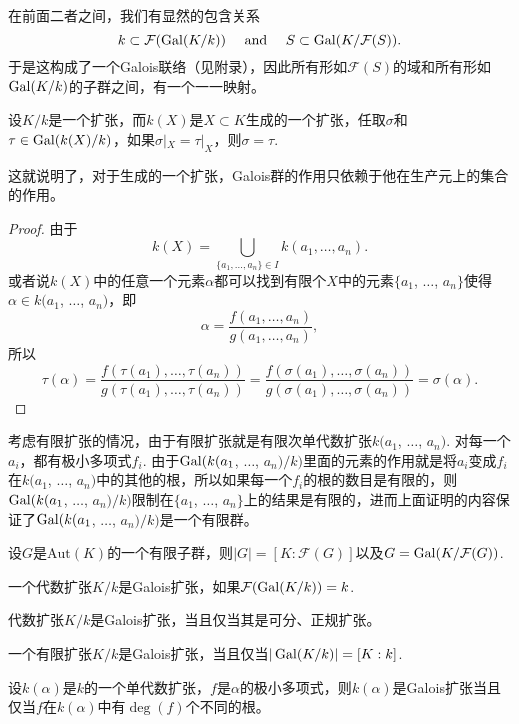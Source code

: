 在前面二者之间，我们有显然的包含关系
\[
    k\subset \mathcal{F}(\operatorname{Gal}(K/k))\quad \text{ and }\quad S\subset \operatorname{Gal}(K/\mathcal{F}(S)).
\]
于是这构成了一个Galois联络（见附录），因此所有形如$\mathcal{F}(S)$的域和所有形如$\operatorname{Gal}(K/k)$的子群之间，有一个一一映射。

\begin{lem}
    设$K/k$是一个扩张，而$k(X)$是$X\subset K$生成的一个扩张，任取$\sigma$和$\tau\in \operatorname{Gal}(k(X)/k)$，如果$\sigma|_X=\tau|_X$，则$\sigma=\tau$.
\end{lem}

这就说明了，对于生成的一个扩张，Galois群的作用只依赖于他在生产元上的集合的作用。

\begin{proof}
    由于\[
        k(X)=\bigcup_{\{a_1,\dots,a_n\}\in I} k(a_1,\dots,a_n).
    \]
    或者说$k(X)$中的任意一个元素$\alpha$都可以找到有限个$X$中的元素$\{a_1$, $\dots$, $a_n\}$使得$\alpha\in k(a_1$, $\dots$, $a_n)$，即
    \[
        \alpha=\frac{f(a_1,\dots,a_n)}{g(a_1,\dots,a_n)},
    \]
    所以
    \[
        \tau(\alpha)=\frac{f(\tau(a_1),\dots,\tau(a_n))}{g(\tau(a_1),\dots,\tau(a_n))}=\frac{f(\sigma(a_1),\dots,\sigma(a_n))}{g(\sigma(a_1),\dots,\sigma(a_n))}=\sigma(\alpha).
    \]
\end{proof}

考虑有限扩张的情况，由于有限扩张就是有限次单代数扩张$k(a_1$, $\dots$, $a_n)$. 对每一个$a_i$，都有极小多项式$f_i$. 由于$\operatorname{Gal}(k(a_1$, $\dots$, $a_n)/k)$里面的元素的作用就是将$a_i$变成$f_i$在$k(a_1$, $\dots$, $a_n)$中的其他的根，所以如果每一个$f_i$的根的数目是有限的，则$\operatorname{Gal}(k(a_1$, $\dots$, $a_n)/k)$限制在$\{a_1$, $\dots$, $a_n\}$上的结果是有限的，进而上面证明的内容保证了$\operatorname{Gal}(k(a_1$, $\dots$, $a_n)/k)$是一个有限群。

\begin{pro}
    设$G$是$\mathrm{Aut}(K)$的一个有限子群，则$|G|=[K:\mathcal{F}(G)]$以及$G=\operatorname{Gal}(K/\mathcal{F}(G))$.
\end{pro}

\para[Galois扩张] 一个代数扩张$K/k$是Galois扩张，如果$\mathcal{F}(\operatorname{Gal}(K/k))=k$.
\endpara

\begin{pro}
    代数扩张$K/k$是Galois扩张，当且仅当其是可分、正规扩张。
\end{pro}

\begin{pro}
    一个有限扩张$K/k$是Galois扩张，当且仅当$|\operatorname{Gal}(K/k)|=[K:k]$.
\end{pro}

\begin{pro}
    设$k(\alpha)$是$k$的一个单代数扩张，$f$是$\alpha$的极小多项式，则$k(\alpha)$是Galois扩张当且仅当$f$在$k(\alpha)$中有$\deg(f)$个不同的根。
\end{pro}

